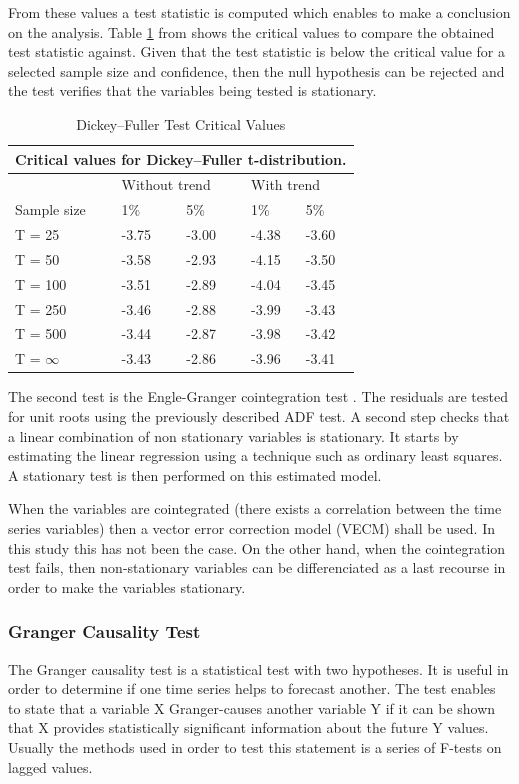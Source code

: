 From these values a test statistic is computed which enables to make a conclusion on the analysis. Table \ref{tab:adf values} from \cite{fuller2009introduction} shows the critical values to compare the obtained test statistic against. Given that the test statistic is below the critical value for a selected sample size and confidence, then the null hypothesis can be rejected and the test verifies that the variables being tested is stationary.

\begin{table}[H]
\centering
\begin{tabular}{@{}lllll@{}}
\toprule
\multicolumn{5}{c}{\textbf{Critical values for Dickey–Fuller t-distribution.}} \\ \midrule
 & \multicolumn{2}{l}{Without   trend} & \multicolumn{2}{l}{With trend} \\
Sample size & 1\% & 5\% & 1\% & 5\% \\ \midrule
T = 25 & -3.75 & -3.00 & -4.38 & -3.60 \\
T = 50 & -3.58 & -2.93 & -4.15 & -3.50 \\
T = 100 & -3.51 & -2.89 & -4.04 & -3.45 \\
T = 250 & -3.46 & -2.88 & -3.99 & -3.43 \\
T = 500 & -3.44 & -2.87 & -3.98 & -3.42 \\
T = $\infty$ & -3.43 & -2.86 & -3.96 & -3.41 \\ \bottomrule
\end{tabular}
\caption{Dickey–Fuller Test Critical Values \citep{fuller2009introduction}}
\label{tab:adf values}
\end{table}

The second test is the Engle-Granger cointegration test \citep{engle1987co}. The residuals are tested for unit roots using the previously described ADF test. A second step checks that a linear combination of non stationary variables is stationary. It starts by estimating the linear regression using a technique such as ordinary least squares. A stationary test is then performed on this estimated model.

When the variables are cointegrated (there exists a correlation between the time series variables) then a vector error correction model (VECM) shall be used. In this study this has not been the case. On the other hand, when the cointegration test fails, then non-stationary variables can be differenciated as a last recourse in order to make the variables stationary.

\subsubsection{Granger Causality Test}

The Granger causality test is a statistical test with two hypotheses. It is useful in order to determine if one time series helps to forecast another. The test enables to state that a variable X Granger-causes another variable Y if it can be shown that X provides statistically significant information about the future Y values. Usually the methods used in order to test this statement is a series of F-tests on lagged values.
